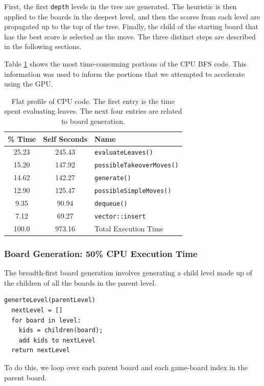 \documentclass[11pt]{article}
\begin{document}
First, the first \texttt{depth} levels in the tree are generated. The heuristic
is then applied to the boards in the deepest level, and then the scores from
each level are propagated up to the top of the tree. Finally, the child
of the starting board that has the best score is selected as the move. The
three distinct steps are described in the following sections.

Table \ref{tab:cpubfsprof} shows the most time-consuming portions of the CPU
BFS code. This information was used to inform the portions that we attempted
to accelerate using the GPU.

\begin{table}[ht]
  \centering
  \begin{tabular}[ht]{ | c | c | l | }
    \hline
    \% Time & Self Seconds & Name\\ 
    \hline
    25.23 & 245.43 & \texttt{evaluateLeaves()} \\
    15.20 & 147.92 & \texttt{possibleTakeoverMoves()} \\
    14.62 & 142.27 & \texttt{generate()} \\
    12.90 & 125.47 & \texttt{possibleSimpleMoves()} \\
     9.35 & 90.94  & \texttt{dequeue()} \\
     7.12 & 69.27  & \texttt{vector::insert} \\
    \hline
    100.0 & 973.16 & Total Execution Time \\
    \hline
  \end{tabular}
  \caption
  {
    Flat profile of CPU code. The first entry is the time spent evaluating
leaves. The next four entries are related to board generation. 
    \label{tab:cpubfsprof}
  }
\end{table}


\subsubsection{Board Generation: 50\% CPU Execution Time}
\label{sec:cpuboardgen}
The breadth-first board generation involves generating a child level made up of the children
of all the boards in the parent level.

\begin{lstlisting}
generteLevel(parentLevel)
  nextLevel = []
  for board in level:
    kids = children(board);
    add kids to nextLevel
  return nextLevel
\end{lstlisting}

To do this, we loop over each parent board and each game-board index in the
parent board.
\end{document}
